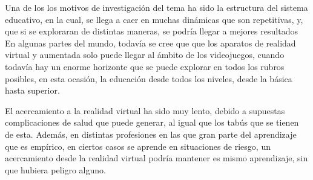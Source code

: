 Una de los los motivos de investigación del tema ha sido la estructura del sistema educativo, en la cual, se llega a caer en muchas din\'amicas que son repetitivas, y, que si se exploraran de distintas maneras, se podría llegar a mejores resultados
En algunas partes del mundo, todavía se cree que que los aparatos de realidad virtual y aumentada solo puede llegar al ámbito de los videojuegos, cuando todavía hay un enorme horizonte que se puede explorar en todos los rubros posibles, en esta ocasión, la educación desde todos los niveles, desde la básica hasta superior.

El acercamiento a la realidad virtual ha sido muy lento, debido a supuestas complicaciones de salud que puede generar, al igual que los tabús que se tienen de esta. Adem\'as, en distintas profesiones en las que gran parte del aprendizaje que es empírico, en ciertos casos se aprende en situaciones de riesgo, un acercamiento desde la realidad virtual podría mantener es mismo aprendizaje, sin que hubiera peligro alguno.
